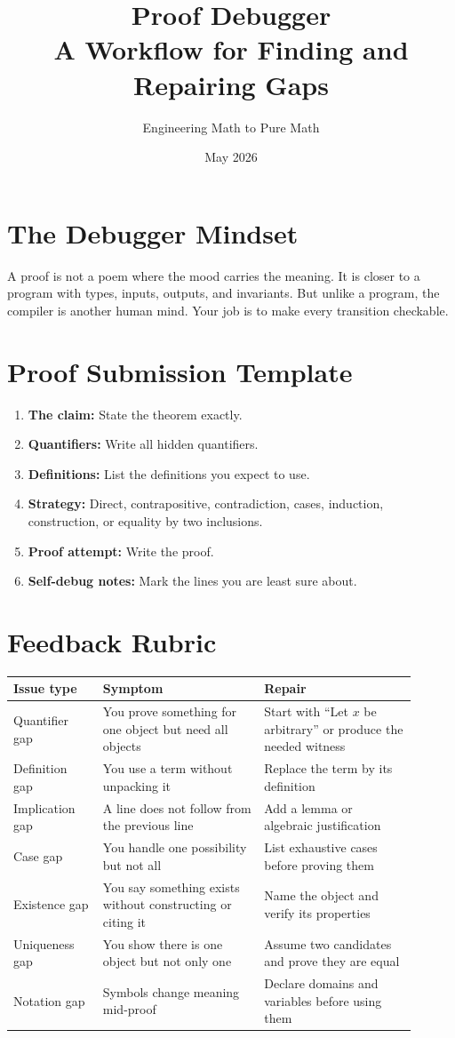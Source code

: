 \documentclass[11pt]{article}
\title{\textbf{Proof Debugger}\\A Workflow for Finding and Repairing Gaps}
\author{Engineering Math to Pure Math}
\date{May 2026}
\begin{document}
\maketitle

\section{The Debugger Mindset}

A proof is not a poem where the mood carries the meaning. It is closer to a program with types, inputs, outputs, and invariants. But unlike a program, the compiler is another human mind. Your job is to make every transition checkable.

\section{Proof Submission Template}

\begin{enumerate}
\item \textbf{The claim:} State the theorem exactly.
\item \textbf{Quantifiers:} Write all hidden quantifiers.
\item \textbf{Definitions:} List the definitions you expect to use.
\item \textbf{Strategy:} Direct, contrapositive, contradiction, cases, induction, construction, or equality by two inclusions.
\item \textbf{Proof attempt:} Write the proof.
\item \textbf{Self-debug notes:} Mark the lines you are least sure about.
\end{enumerate}

\section{Feedback Rubric}

\begin{longtable}{p{0.2\linewidth}p{0.36\linewidth}p{0.34\linewidth}}
\toprule
Issue type & Symptom & Repair \\
\midrule
Quantifier gap & You prove something for one object but need all objects & Start with ``Let $x$ be arbitrary'' or produce the needed witness \\
Definition gap & You use a term without unpacking it & Replace the term by its definition \\
Implication gap & A line does not follow from the previous line & Add a lemma or algebraic justification \\
Case gap & You handle one possibility but not all & List exhaustive cases before proving them \\
Existence gap & You say something exists without constructing or citing it & Name the object and verify its properties \\
Uniqueness gap & You show there is one object but not only one & Assume two candidates and prove they are equal \\
Notation gap & Symbols change meaning mid-proof & Declare domains and variables before using them \\
\bottomrule
\end{longtable}
\end{document}

